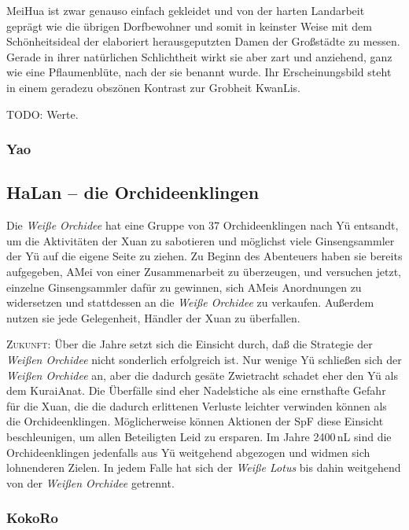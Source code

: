 \documentclass[
a4paper,
twoside,
DIV=calc,
BCOR=4mm,
fontsize=9pt,
twocolumn=on,
titlepage=on,
parskip=half
]{scrartcl}
\begin{document}
MeiHua ist zwar genauso einfach gekleidet und von der harten
Landarbeit geprägt wie die übrigen Dorfbewohner und somit in keinster
Weise mit dem Schönheitsideal der elaboriert herausgeputzten Damen der
Großstädte zu messen. Gerade in ihrer natürlichen Schlichtheit wirkt
sie aber zart und anziehend, ganz wie eine Pflaumenblüte, nach der sie
benannt wurde. Ihr Erscheinungsbild steht in einem geradezu obszönen
Kontrast zur Grobheit KwanLis.


TODO: Werte.

\subsubsection{Yao}
\label{yao}


\subsection{HaLan -- die Orchideenklingen}

Die \emph{Weiße Orchidee} hat eine Gruppe von 37 Orchideenklingen nach
Yü entsandt, um die Aktivitäten der Xuan zu sabotieren und möglichst
viele Ginsengsammler der Yü auf die eigene Seite zu ziehen. Zu Beginn
des Abenteuers haben sie bereits aufgegeben, AMei von einer
Zusammenarbeit zu überzeugen, und versuchen jetzt, einzelne
Ginsengsammler dafür zu gewinnen, sich AMeis Anordnungen zu
widersetzen und stattdessen an die \emph{Weiße Orchidee} zu
verkaufen. Außerdem nutzen sie jede Gelegenheit, Händler der Xuan zu
überfallen.

\textsc{Zukunft:} Über die Jahre setzt sich die Einsicht durch, daß
die Strategie der \emph{Weißen Orchidee} nicht sonderlich erfolgreich
ist. Nur wenige Yü schließen sich der \emph{Weißen Orchidee} an, aber
die dadurch gesäte Zwietracht schadet eher den Yü als dem KuraiAnat.
Die Überfälle sind eher Nadelstiche als eine ernsthafte Gefahr für die
Xuan, die die dadurch erlittenen Verluste leichter verwinden können als
die Orchideenklingen. Möglicherweise können Aktionen der SpF diese
Einsicht beschleunigen, um allen Beteiligten Leid zu ersparen. Im
Jahre 2400\,nL sind die Orchideenklingen jedenfalls aus Yü weitgehend
abgezogen und widmen sich lohnenderen Zielen. In jedem Falle hat sich
der \emph{Weiße Lotus} bis dahin weitgehend von der \emph{Weißen
  Orchidee} getrennt.

\subsubsection{KokoRo}
\end{document}
